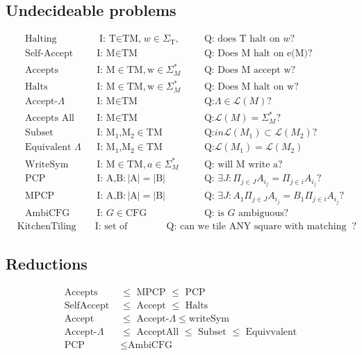 \documentclass{article}
\theoremstyle{remark}
\numberwithin{equation}{section}
\begin{document}
\subsection{Undecideable problems}
\begin{align}
	&\text{Halting} &&\text{I: T$\in$TM,}w\in\Sigma_\text{T} \text{,}&&&\text{Q: does T halt on }w?\\
	&\text{Self-Accept} &&\text{I: M}\in\text{TM} &&&\text{Q: Does M halt on e(M)?}\\
	&\text{Accepts} &&\text{I: M}\in\text{TM},\text{w}\in\Sigma_M^*
	&&&\text{Q: Does M accept w?}\\
	&\text{Halts} &&\text{I: M}\in\text{TM},\text{w}\in\Sigma_M^* &&&\text{Q: Does M halt on w?}\\
	&\text{Accept-}\Lambda &&\text{I: M}\in\text{TM} &&&\text{Q:}\Lambda\in\mathcal{L}(M)?\\
	&\text{Accepts All} &&\text{I: M}\in\text{TM} &&&\text{Q:}\mathcal{L}(M)=\Sigma_M^*?\\
	&\text{Subset } &&\text{I: M$_1$,M$_2$}\in\text{TM} &&&\text{Q:}in\mathcal{L}(M_1)\subset\mathcal{L}(M_2)?\\
	&\text{Equivalent }\Lambda &&\text{I: M$_1$,M$_2$}\in\text{TM} &&&\text{Q:}\mathcal{L}(M_1)=\mathcal{L}(M_2)\\
	&\text{WriteSym } &&\text{I: M}\in\text{TM},a\in\Sigma_M^* &&&\text{Q: will M write a}?\\
	&\text{PCP } &&\text{I: A,B}:|\text{A}|=|\text{B}| &&&\text{Q: }\exists J: \Pi_{j\in J} A_{i_j} = \Pi_{j\in i} A_{i_j}?\\
	&\text{MPCP } &&\text{I: A,B}:|\text{A}|=|\text{B}| &&&\text{Q: }\exists J: A_1\Pi_{j\in J} A_{i_j} = B_1 \Pi_{j\in i} A_{i_j}?\\
	&\text{AmbiCFG } &&\text{I: }G\in\text{CFG} &&&\text{Q: is $G$ ambiguous}?
\end{align}
\begin{align}
	&\text{KitchenTiling } &&\text{I: set of tiles} &&&\text{Q: can we tile ANY square with matching sides}?
\end{align}
\subsection{Reductions}
\begin{align}
	\text{Accepts }&\leq \text{ MPCP } \leq \text{ PCP}\\
	\text{SelfAccept }&\leq\text{ Accept }\leq\text{ Halts}\\
	\text{Accept }&\leq \text{ Accept-}\Lambda \leq \text{writeSym}\\
	\text{Accept-}\Lambda&\leq\text{ AcceptAll }\leq\text{ Subset }\leq\text{ Equivvalent}\\
	\text{PCP }&\leq\text{AmbiCFG}
\end{align}
\end{document}
